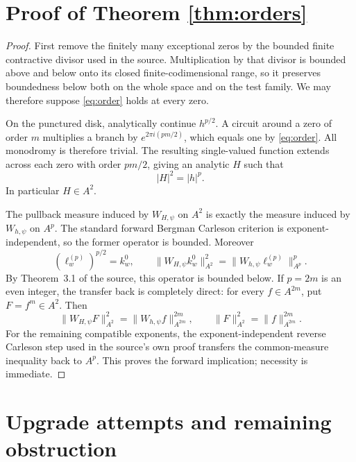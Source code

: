 \documentclass[11pt]{article}
\begin{document}
\section{Proof of Theorem \ref{thm:orders}}

\begin{proof}
First remove the finitely many exceptional zeros by the bounded finite
contractive divisor used in the source.  Multiplication by that divisor is
bounded above and below onto its closed finite-codimensional range, so it
preserves boundedness below both on the whole space and on the test family.
We may therefore suppose \eqref{eq:order} holds at every zero.

On the punctured disk, analytically continue $h^{p/2}$.  A circuit around a
zero of order $m$ multiplies a branch by $e^{2\pi i(pm/2)}$, which equals one
by \eqref{eq:order}.  All monodromy is therefore trivial.  The resulting
single-valued function extends across each zero with order $pm/2$, giving
an analytic $H$ such that
\begin{equation}\label{eq:H}
 |H|^2=|h|^p.
\end{equation}
In particular $H\in A^2$.

The pullback measure induced by $W_{H,\psi}$ on $A^2$ is exactly the measure
induced by $W_{h,\psi}$ on $A^p$.  The standard forward Bergman Carleson
criterion is exponent-independent, so the former operator is bounded.
Moreover
\[
 (\ell_w^{(p)})^{p/2}=k_w^0,
 \qquad
 \|W_{H,\psi}k_w^0\|_{A^2}^2
 =\|W_{h,\psi}\ell_w^{(p)}\|_{A^p}^p.
\]
By Theorem~3.1 of the source, this operator is bounded below.  If $p=2m$ is
an even integer, the transfer back is completely direct: for every $f\in
A^{2m}$, put $F=f^m\in A^2$.  Then
\[
 \|W_{H,\psi}F\|_{A^2}^2=\|W_{h,\psi}f\|_{A^{2m}}^{2m},
 \qquad \|F\|_{A^2}^2=\|f\|_{A^{2m}}^{2m}.
\]
For the remaining compatible exponents, the exponent-independent reverse
Carleson step used in the source's own proof transfers the common-measure
inequality back to $A^p$.  This proves the forward implication; necessity is
immediate.
\end{proof}

\section{Upgrade attempts and remaining obstruction}
\end{document}

